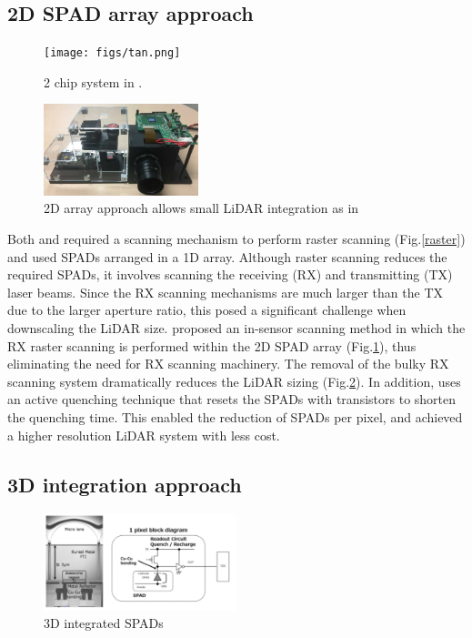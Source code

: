 \documentclass[paper]{ieice}
\begin{document}
\subsection{2D SPAD array approach}
\begin{figure}[!t]
\centering
 \texttt{[image: figs/tan.png]}
  \caption{2 chip system in \cite{ta20202d}.}
\label{tan}
\end{figure}

\begin{figure}[!t]
\centering
 \includegraphics[width=0.4\textwidth]{figs/toshiba-proto.png}
  \caption{2D array approach allows small LiDAR integration as in \cite{ieee}}
\label{ieee}
\end{figure}

\qquad Both \cite{niclass2012100} and \cite{yoshioka201820} required a scanning mechanism to perform raster scanning (Fig.\ref{raster}) and used SPADs arranged in a 1D array.
Although raster scanning reduces the required SPADs, it involves scanning the receiving (RX) and transmitting (TX) laser beams. Since the RX scanning mechanisms are much larger than the TX due to the larger aperture ratio, this posed a significant challenge when downscaling the LiDAR size.
\cite{ta20202d} proposed an in-sensor scanning method in which the RX raster scanning is performed within the 2D SPAD array (Fig.\ref{tan}), thus eliminating the need for RX scanning machinery.
The removal of the bulky RX scanning system dramatically reduces the LiDAR sizing (Fig.\ref{ieee}).
In addition, \cite{ta20202d} uses an active quenching technique that resets the SPADs with transistors to shorten the quenching time. This enabled the reduction of SPADs per pixel,  and \cite{ta20202d}  achieved a higher resolution LiDAR system with less cost.

\subsection{3D integration approach}
\begin{figure}[!t]
\centering
 \includegraphics[width=0.5\textwidth]{figs/sonypix.png}
  \caption{3D integrated SPADs \cite{ito2020back}}
\label{sony3d}
\end{figure}
\end{document}
